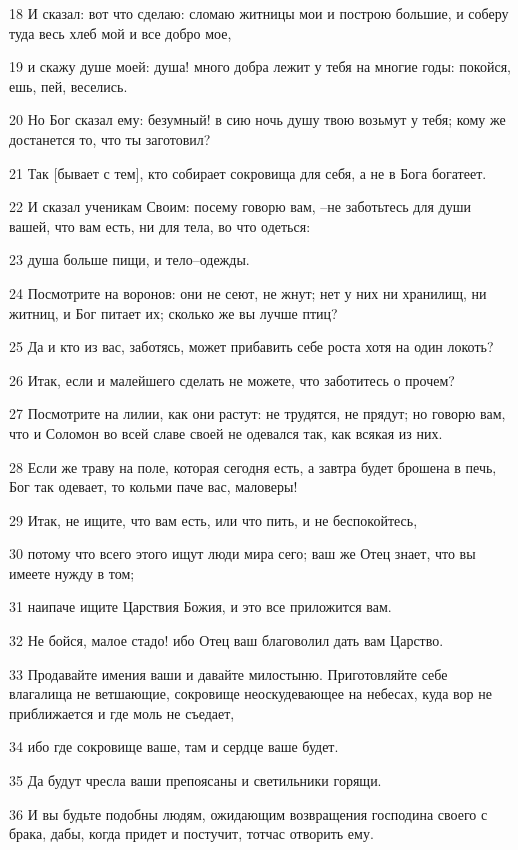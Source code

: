 \par 18 И сказал: вот что сделаю: сломаю житницы мои и построю большие, и соберу туда весь хлеб мой и все добро мое,
\par 19 и скажу душе моей: душа! много добра лежит у тебя на многие годы: покойся, ешь, пей, веселись.
\par 20 Но Бог сказал ему: безумный! в сию ночь душу твою возьмут у тебя; кому же достанется то, что ты заготовил?
\par 21 Так [бывает с тем], кто собирает сокровища для себя, а не в Бога богатеет.
\par 22 И сказал ученикам Своим: посему говорю вам, --не заботьтесь для души вашей, что вам есть, ни для тела, во что одеться:
\par 23 душа больше пищи, и тело--одежды.
\par 24 Посмотрите на воронов: они не сеют, не жнут; нет у них ни хранилищ, ни житниц, и Бог питает их; сколько же вы лучше птиц?
\par 25 Да и кто из вас, заботясь, может прибавить себе роста хотя на один локоть?
\par 26 Итак, если и малейшего сделать не можете, что заботитесь о прочем?
\par 27 Посмотрите на лилии, как они растут: не трудятся, не прядут; но говорю вам, что и Соломон во всей славе своей не одевался так, как всякая из них.
\par 28 Если же траву на поле, которая сегодня есть, а завтра будет брошена в печь, Бог так одевает, то кольми паче вас, маловеры!
\par 29 Итак, не ищите, что вам есть, или что пить, и не беспокойтесь,
\par 30 потому что всего этого ищут люди мира сего; ваш же Отец знает, что вы имеете нужду в том;
\par 31 наипаче ищите Царствия Божия, и это все приложится вам.
\par 32 Не бойся, малое стадо! ибо Отец ваш благоволил дать вам Царство.
\par 33 Продавайте имения ваши и давайте милостыню. Приготовляйте себе влагалища не ветшающие, сокровище неоскудевающее на небесах, куда вор не приближается и где моль не съедает,
\par 34 ибо где сокровище ваше, там и сердце ваше будет.
\par 35 Да будут чресла ваши препоясаны и светильники горящи.
\par 36 И вы будьте подобны людям, ожидающим возвращения господина своего с брака, дабы, когда придет и постучит, тотчас отворить ему.
